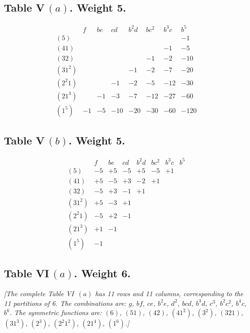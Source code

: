 \documentclass[11pt,a4paper]{article}
\begin{document}
\subsection*{Table V\,$(a)$. Weight 5.}
\[
\begin{array}{c|ccccccc}
& f & be & cd & b^2 d & bc^2 & b^3 c & b^5 \\ \hline
(5) & & & & & & & -1 \\
(41) & & & & & & -1 & -5 \\
(32) & & & & & -1 & -2 & -10 \\
(31^2) & & & & -1 & -2 & -7 & -20 \\
(2^2 1) & & & -1 & -2 & -5 & -12 & -30 \\
(21^3) & & -1 & -3 & -7 & -12 & -27 & -60 \\
(1^5) & -1 & -5 & -10 & -20 & -30 & -60 & -120
\end{array}
\]

\subsection*{Table V\,$(b)$. Weight 5.}
\[
\begin{array}{c|ccccccc}
& f & be & cd & b^2 d & bc^2 & b^3 c & b^5 \\ \hline
(5) & -5 & +5 & -5 & +5 & -5 & +1 \\
(41) & +5 & -5 & +3 & -2 & +1 \\
(32) & -5 & +3 & -1 & +1 \\
(31^2) & +5 & -3 & +1 \\
(2^2 1) & -5 & +2 & -1 \\
(21^3) & +1 & -1 \\
(1^5) & -1
\end{array}
\]

\newpage
\subsection*{Table VI\,$(a)$. Weight 6.}

\textit{[The complete Table VI~$(a)$ has 11 rows and 11 columns, corresponding
to the 11 partitions of 6. The combinations are: $g$, $bf$, $ce$, $b^2 e$,
$d^2$, $bcd$, $b^3 d$, $c^3$, $b^2 c^2$, $b^4 c$, $b^6$. The symmetric
functions are: $(6)$, $(51)$, $(42)$, $(41^2)$, $(3^2)$, $(321)$, $(31^3)$,
$(2^3)$, $(2^2 1^2)$, $(21^4)$, $(1^6)$.]}
\end{document}
